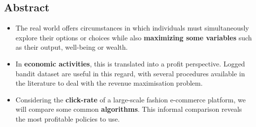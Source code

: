 \documentclass[a0,portrait]{a0poster}
\begin{document}
\begin{multicols}{2} %


\color{DarkRed}

\section*{Abstract}

\begin{itemize}
    \item [] The real world offers circumstances in which individuals must simultaneously explore their options or choices while also \textbf{maximizing some variables} such as their output, well-being or wealth.
    \item[] In \textbf{economic activities}, this is translated into a profit perspective. Logged bandit dataset are useful in this regard, with several procedures available in the literature to deal with the revenue maximisation problem.
    \item[] Considering the \textbf{click-rate} of a large-scale fashion e-commerce platform, we will compare some common \textbf{algorithms}. This informal comparison reveals the most profitable policies to use.
\end{itemize}

\end{multicols}
\end{document}
